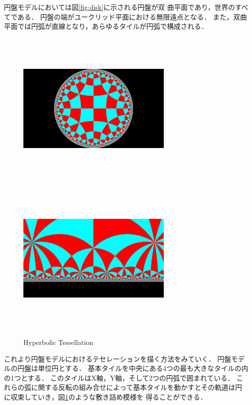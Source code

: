 円盤モデルにおいては図\ref{fig:disk}に示される円盤が双
曲平面であり，世界のすべてである．
円盤の端がユークリッド平面における無限遠点となる．
また，双曲平面では円弧が直線となり，あらゆるタイルが円弧で構成される．

\begin{figure}[h!tbp]
 \begin{minipage}{0.49\hsize}
  \center
  \includegraphics[width=3in, height=3in,
  keepaspectratio]{../img/tessellation/hyperbolicTessellation.pdf}
  \label{fig:disk}
 \end{minipage}
 \hspace*{\fill}
 \begin{minipage}{0.49\hsize}
  \center
  \includegraphics[width=3in, height=3in, keepaspectratio]{../img/tessellation/upperHalf.pdf}
  \label{fig:upperHalf}
 \end{minipage}
  \caption{Hyperbolic Tessellation}
  \label{fig:hyperbolicTessellation}
\end{figure}

これより円盤モデルにおけるテセレーションを描く方法をみていく．
円盤モデルの円盤は単位円とする．
基本タイルを中央にある4つの最も大きなタイルの内の1つとする．
このタイルはX軸，Y軸，そして2つの円弧で囲まれている．
これらの弧に関する反転の組み合せによって基本タイルを動かすとその軌道は円
に収束していき，図\ref{fig:hyperbolicTessellation}のような敷き詰め模様を
得ることができる．

